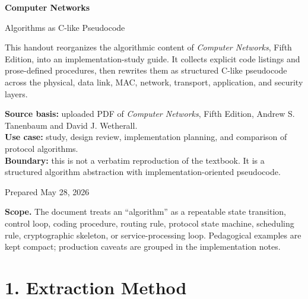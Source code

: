 \documentclass[11pt]{article}
\begin{document}
\hypersetup{pageanchor=false}

\begin{titlepage}
  \centering
  \vspace*{2.2cm}
  {\Huge\bfseries\color{CNBlue}Computer Networks\par}
  \vspace{0.45cm}
  {\LARGE Algorithms as C-like Pseudocode\par}
  \vspace{1.35cm}
  \begin{scopebox}
  This handout reorganizes the algorithmic content of \textit{Computer Networks}, Fifth Edition, into an implementation-study guide. It collects explicit code listings and prose-defined procedures, then rewrites them as structured C-like pseudocode across the physical, data link, MAC, network, transport, application, and security layers.
  \end{scopebox}
  \vspace{0.85cm}
  \begin{methodbox}
  \textbf{Source basis:} uploaded PDF of \textit{Computer Networks}, Fifth Edition, Andrew S. Tanenbaum and David J. Wetherall.\\
  \textbf{Use case:} study, design review, implementation planning, and comparison of protocol algorithms.\\
  \textbf{Boundary:} this is not a verbatim reproduction of the textbook. It is a structured algorithm abstraction with implementation-oriented pseudocode.
  \end{methodbox}
  \vfill
  {\large Prepared May 28, 2026\par}
\end{titlepage}

\hypersetup{pageanchor=true}
\tableofcontents
\clearpage
{}

\begin{scopebox}
\textbf{Scope.} The document treats an ``algorithm'' as a repeatable state transition, control loop, coding procedure, routing rule, protocol state machine, scheduling rule, cryptographic skeleton, or service-processing loop. Pedagogical examples are kept compact; production caveats are grouped in the implementation notes.
\end{scopebox}

\section{1. Extraction Method}\label{extraction-method}
\end{document}
